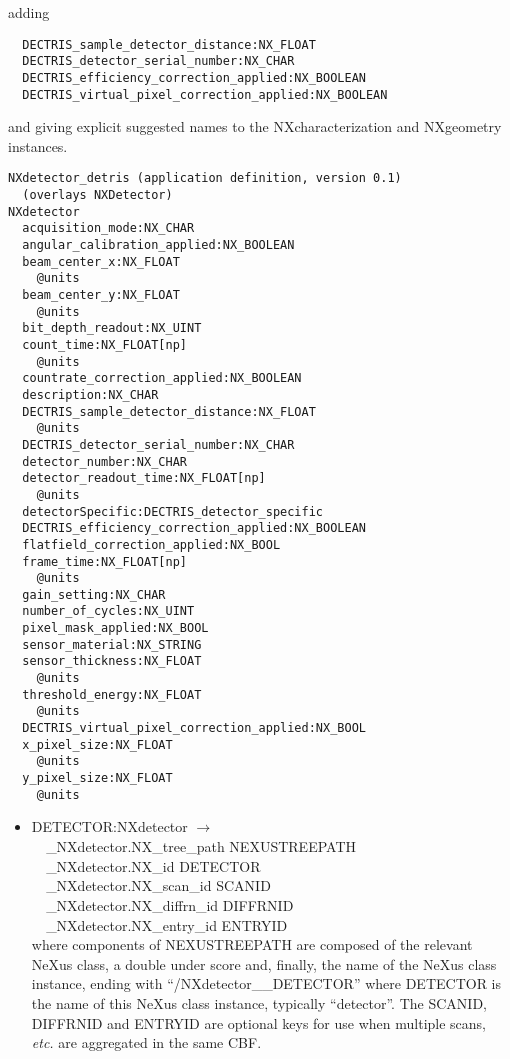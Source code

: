 \documentclass[11pt]{article}
\begin{document}
{{adding 

\begin{verbatim}
  DECTRIS_sample_detector_distance:NX_FLOAT
  DECTRIS_detector_serial_number:NX_CHAR
  DECTRIS_efficiency_correction_applied:NX_BOOLEAN 
  DECTRIS_virtual_pixel_correction_applied:NX_BOOLEAN
\end{verbatim}

and giving explicit suggested names to the NXcharacterization and NXgeometry
instances.  

\begin{verbatim}
NXdetector_detris (application definition, version 0.1)
  (overlays NXDetector)
NXdetector
  acquisition_mode:NX_CHAR
  angular_calibration_applied:NX_BOOLEAN
  beam_center_x:NX_FLOAT
    @units
  beam_center_y:NX_FLOAT
    @units
  bit_depth_readout:NX_UINT
  count_time:NX_FLOAT[np]
    @units
  countrate_correction_applied:NX_BOOLEAN
  description:NX_CHAR
  DECTRIS_sample_detector_distance:NX_FLOAT
    @units
  DECTRIS_detector_serial_number:NX_CHAR
  detector_number:NX_CHAR
  detector_readout_time:NX_FLOAT[np]
    @units
  detectorSpecific:DECTRIS_detector_specific
  DECTRIS_efficiency_correction_applied:NX_BOOLEAN
  flatfield_correction_applied:NX_BOOL
  frame_time:NX_FLOAT[np]
    @units
  gain_setting:NX_CHAR
  number_of_cycles:NX_UINT
  pixel_mask_applied:NX_BOOL
  sensor_material:NX_STRING
  sensor_thickness:NX_FLOAT
    @units
  threshold_energy:NX_FLOAT
    @units
  DECTRIS_virtual_pixel_correction_applied:NX_BOOL
  x_pixel_size:NX_FLOAT
    @units
  y_pixel_size:NX_FLOAT
    @units
\end{verbatim}

\begin{itemize}

\item{DETECTOR:NXdetector $\rightarrow$\\
\verb|  |\_NXdetector.NX\_tree\_path    NEXUSTREEPATH \\
\verb|  |\_NXdetector.NX\_id            DETECTOR \\
\verb|  |\_NXdetector.NX\_scan\_id      SCANID \\
\verb|  |\_NXdetector.NX\_diffrn\_id    DIFFRNID \\
\verb|  |\_NXdetector.NX\_entry\_id     ENTRYID \\
where components of NEXUSTREEPATH are composed of the
relevant NeXus class, a double under score and, finally, the
name of the NeXus class instance, ending with ``/NXdetector\_\_DETECTOR''
where DETECTOR is the name of this NeXus class instance, typically ``detector''.
The SCANID, DIFFRNID and ENTRYID are optional keys for use
when multiple scans, {\it etc.} are aggregated in the same CBF.}


\end{itemize}}}
\end{document}
